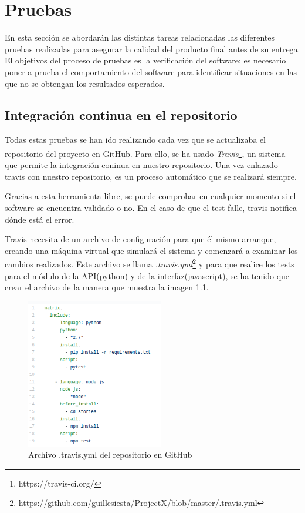 \chapter{Pruebas}

En esta sección se abordarán las distintas tareas relacionadas las diferentes pruebas realizadas para asegurar la calidad del producto final antes de su entrega. El  objetivos del proceso de pruebas es la verificación del software; es necesario poner a prueba el comportamiento del software para identificar situaciones en las que no se obtengan los resultados esperados.

\section{Integración continua en el repositorio}

Todas estas pruebas se han ido realizando cada vez que se actualizaba el repositorio del proyecto en GitHub. Para ello, se ha usado \textit{Travis}\footnote{https://travis-ci.org/}, un sistema que permite la integración coninua en nuestro repositorio. Una vez enlazado travis con nuestro repositorio, es un proceso automático que se realizará siempre.

Gracias a esta herramienta libre, se puede comprobar en cualquier momento si el software se encuentra validado o no. En el caso de que el test falle, travis notifica dónde está el error. 

Travis necesita de un archivo de configuración para que él mismo arranque, creando una máquina virtual que simulará el sistema y comenzará a examinar los cambios realizados. Este archivo se llama \textit{.travis.yml}\footnote{https://github.com/guillesiesta/ProjectX/blob/master/.travis.yml} y para que realice los tests para el módulo de la API(python) y de  la interfaz(javascript), se ha tenido que crear el archivo de la manera que muestra la imagen \ref{fig::travis}.

\begin{figure}
    \centerline{\includegraphics[width=6cm]{figuras/travis.png}}
    \caption{Archivo .travis.yml del repositorio en GitHub}
    \label{fig::travis}
\end{figure}

